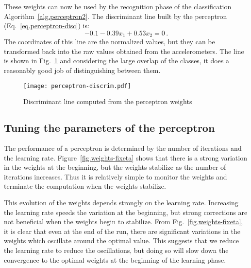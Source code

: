 These weights can now be used by the recognition phase of the classification Algorithm~\ref{alg.perceptron2}. The discriminant line built by the perceptron (Eq.~\ref{eq.perceptron-disc}) is:
\[
-0.1 -0.39x_1 + 0.53x_2 = 0\,.
\]
The coordinates of this line are the normalized values, but they can be transformed back into the raw values obtained from the accelerometers. The line is shown in Fig.~\ref{fig.perceptron-dis} and considering the large overlap of the classes, it does a reasonably good job of distinguishing between them.

\begin{figure}
\begin{center}
\texttt{[image: perceptron-discrim.pdf]}
\end{center}
\caption{Discriminant line computed from the perceptron weights}\label{fig.perceptron-dis}
\end{figure}

\subsection{Tuning the parameters of the perceptron}

The performance of a perceptron is determined by the number of iterations and the learning rate. Figure~\ref{fig.weights-fixeta} shows that there is a strong variation in the weights at the beginning, but the weights stabilize as the number of iterations increases. Thus it is relatively simple to monitor the weights and terminate the computation when the weights stabilize.

This evolution of the weights depends strongly on the learning rate. Increasing the learning rate speeds the variation at the beginning, but strong corrections are not beneficial when the weights begin to stabilize. From Fig.~\ref{fig.weights-fixeta}, it is clear that even at the end of the run, there are significant variations in the weights which oscillate around the optimal value. This suggests that we reduce the learning rate to reduce the oscillations, but doing so will slow down the convergence to the optimal weights at the beginning of the learning phase.

